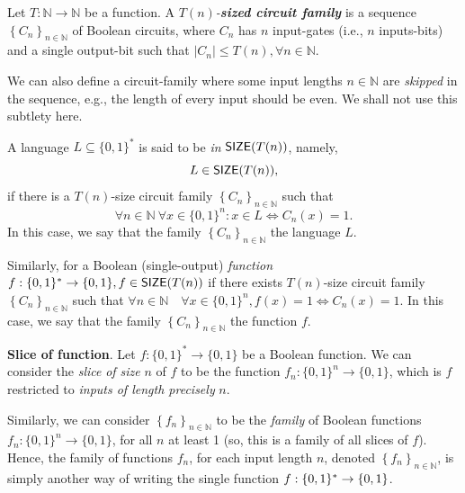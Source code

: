 \begin{svgraybox}
\begin{definition}
Let $T:\mathbb{N}\rightarrow \mathbb{N}$ be a function. 
A \emph{$T(n)$-\textbf{sized circuit family}} is a sequence $\left\{C_n\right\}_{n \in \mathbb{N}}$ of Boolean circuits, where $C_n$ has $n$ input-gates (i.e., $n$ inputs-bits) and a single output-bit such that  $\left|C_n\right| \leq T(n), \forall n \in \mathbb{N}$.
\end{definition}
\end{svgraybox}

\begin{remark}We can also define a circuit-family where some input lengths $n\in\mathbb{N}$ are \emph{skipped} in the sequence, e.g.,  the length of every input should be even. We shall not use this subtlety here.
\end{remark}

A language $L\subseteq\{0,1\}^*$ is said to be \emph{in} $\operatorname{{\mathsf{SIZE}}} (T(n))$, namely, $$L\in\operatorname{{\mathsf{SIZE}}} (T(n)),$$ if there is a $T(n)$-size circuit family $\left\{C_n\right\}_{n \in \mathbb{N}}$ such that 
$$\forall n \in \mathbb{N~} \forall x \in\{0,1\}^n: x \in L \Leftrightarrow C_n(x)=1.$$
In this case, we say that 
the family $\left\{C_n\right\}_{n \in \mathbb{N}}$  the language $L$.


Similarly, for a Boolean (single-output) \emph{function} $f:\{0,1\}^* \rightarrow\{0,1\}, f \in \operatorname{{\mathsf{SIZE}}}(T(n))$ if there exists $ T(n)$-size circuit family $\left\{C_n\right\}_{n \in \mathbb{N}}$ such that  $\forall n \in \mathbb{N} \quad \forall x \in\{0,1\}^n, f(x)=1 \Leftrightarrow C_n(x)=1$.
In this case, we say that 
the family $\left\{C_n\right\}_{n \in \mathbb{N}}$  the function $f$.



\begin{svgraybox}
\textbf{Slice of function}. 
 Let $f:\{0,1\}^*\to\{0,1\}$ be a Boolean function.
We can consider the \emph{slice} \emph{of size} $n$ of $f$ to be the function $f_n:\{0,1\}^n\to\{0,1\}$, which is $f$ restricted to \emph{inputs of length precisely} $n$. 
\end{svgraybox}

Similarly, we can consider $\left\{f_{n}\right\}_{n\in\mathbb{N}}$ to be the \textit{family} of Boolean functions $f_n:\{0,1\}^n\to \{0,1\}$, 
for all $n$ at least 1 (so, this is a family of all slices of $f$). Hence, the family of functions $f_n$, for each input length $n$, denoted  $\left\{f_{n}\right\}_{n\in\mathbb{N}}$, is simply another way of writing the single function $f:\{0,1\}^*\to\{0,1\}$. 





